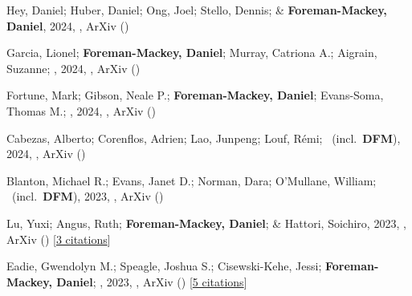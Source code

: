 \item[{\color{numcolor}\scriptsize15}] Hey, Daniel; Huber, Daniel; Ong, Joel; Stello, Dennis; \& \textbf{Foreman-Mackey, Daniel}, 2024, , ArXiv ()

\item[{\color{numcolor}\scriptsize14}] Garcia, Lionel; \textbf{Foreman-Mackey, Daniel}; Murray, Catriona A.; Aigrain, Suzanne; \etal, 2024, , ArXiv ()

\item[{\color{numcolor}\scriptsize13}] Fortune, Mark; Gibson, Neale P.; \textbf{Foreman-Mackey, Daniel}; Evans-Soma, Thomas M.; \etal, 2024, , ArXiv ()

\item[{\color{numcolor}\scriptsize12}] Cabezas, Alberto; Corenflos, Adrien; Lao, Junpeng; Louf, R{\'e}mi; \etal\ (incl.\ \textbf{DFM}), 2024, , ArXiv ()

\item[{\color{numcolor}\scriptsize11}] Blanton, Michael R.; Evans, Janet D.; Norman, Dara; O'Mullane, William; \etal\ (incl.\ \textbf{DFM}), 2023, , ArXiv ()

\item[{\color{numcolor}\scriptsize10}] Lu, Yuxi; Angus, Ruth; \textbf{Foreman-Mackey, Daniel}; \& Hattori, Soichiro, 2023, , ArXiv () [\href{https://ui.adsabs.harvard.edu/abs/2023arXiv231014990L}{3 citations}]

\item[{\color{numcolor}\scriptsize9}] Eadie, Gwendolyn M.; Speagle, Joshua S.; Cisewski-Kehe, Jessi; \textbf{Foreman-Mackey, Daniel}; \etal, 2023, , ArXiv () [\href{https://ui.adsabs.harvard.edu/abs/2023arXiv230204703E}{5 citations}]

